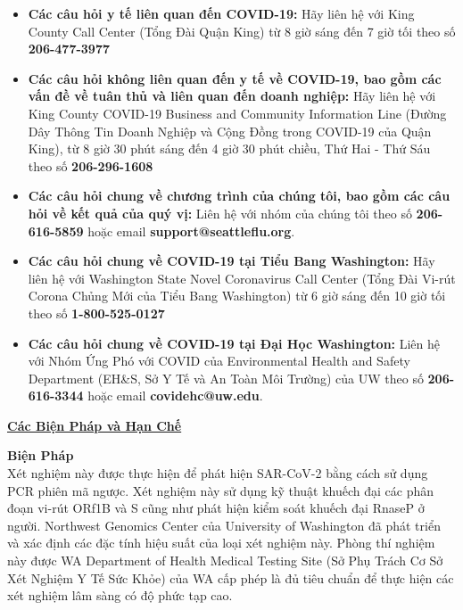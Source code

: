 \documentclass[10pt]{article}
\begin{document}
\begin{itemize}

\item

  \textbf{Các câu hỏi y tế liên quan đến COVID-19:} Hãy liên hệ với King County
  Call Center (Tổng Đài Quận King) từ 8 giờ sáng đến 7 giờ tối theo số
  \textbf{206-477-3977}

\item

  \textbf{Các câu hỏi không liên quan đến y tế về COVID-19, bao gồm các vấn đề
  về tuân thủ và liên quan đến doanh nghiệp:} Hãy liên hệ với King County
  COVID-19 Business and Community Information Line (Đường Dây Thông Tin Doanh
  Nghiệp và Cộng Đồng trong COVID-19 của Quận King), từ 8 giờ 30 phút sáng đến 4
  giờ 30 phút chiều, Thứ Hai - Thứ Sáu theo số \textbf{206-296-1608}

\item

  \textbf{Các câu hỏi chung về chương trình của chúng tôi, bao gồm các câu hỏi
  về kết quả của quý vị:} Liên hệ với nhóm của chúng tôi theo
  số \textbf{206-616-5859} hoặc email \textbf{support@seattleflu.org}.

\item

  \textbf{Các câu hỏi chung về COVID-19 tại Tiểu Bang Washington:} Hãy liên hệ
  với Washington State Novel Coronavirus Call Center (Tổng Đài Vi-rút Corona
  Chủng Mới của Tiểu Bang Washington) từ 6 giờ sáng đến 10 giờ tối theo số
  \textbf{1-800-525-0127}

\item
  \textbf{Các câu hỏi chung về COVID-19 tại Đại Học Washington:} Liên hệ với
  Nhóm Ứng Phó với COVID của Environmental Health and Safety Department (EH\&S,
  Sở Y Tế và An Toàn Môi Trường) của UW theo số \textbf{206-616-3344} hoặc email
  \textbf{covidehc@uw.edu}.

\end{itemize}

\bigskip

\large \underline{\textbf{Các Biện Pháp và Hạn Chế}}

\textbf{Biện Pháp}\\
Xét nghiệm này được thực hiện để phát hiện SAR-CoV-2 bằng cách sử dụng PCR phiên
mã ngược. Xét nghiệm này sử dụng kỹ thuật khuếch đại các phân đoạn vi-rút ORf1B
và S cũng như phát hiện kiểm soát khuếch đại RnaseP ở người. Northwest Genomics
Center của University of Washington đã phát triển và xác định các đặc tính hiệu
suất của loại xét nghiệm này. Phòng thí nghiệm này được WA Department of Health
Medical Testing Site (Sở Phụ Trách Cơ Sở Xét Nghiệm Y Tế Sức Khỏe) của WA cấp
phép là đủ tiêu chuẩn để thực hiện các xét nghiệm lâm sàng có độ phức tạp cao.
\end{document}
